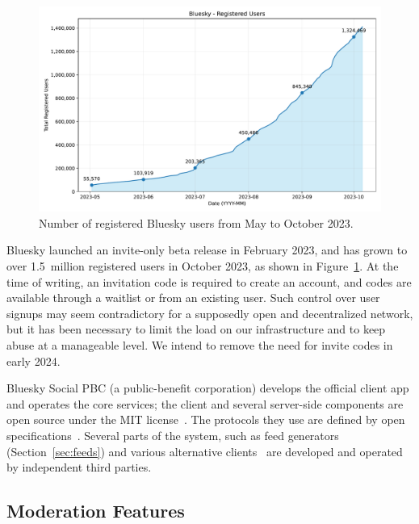 \documentclass[sigconf,nonacm]{acmart}
\begin{document}
\begin{figure}
    \centering
    \includegraphics[width=\linewidth]{user-growth.pdf}
    \caption{Number of registered Bluesky users from May to October 2023.}
    \label{fig:user-growth}
\end{figure}

Bluesky launched an invite-only beta release in February 2023, and has grown to over 1.5~million registered users in October 2023, as shown in Figure~\ref{fig:user-growth}.
At the time of writing, an invitation code is required to create an account, and codes are available through a waitlist or from an existing user.
Such control over user signups may seem contradictory for a supposedly open and decentralized network, but it has been necessary to limit the load on our infrastructure and to keep abuse at a manageable level.
We intend to remove the need for invite codes in early 2024.

Bluesky Social PBC (a public-benefit corporation) develops the official client app and operates the core services; the client and several server-side components are open source under the MIT license~\cite{BlueskyGithub}.
The protocols they use are defined by open specifications~\cite{AtProtoSpecs}.
Several parts of the system, such as feed generators (Section~\ref{sec:feeds}) and various alternative clients~\cite{AtProtoClients} are developed and operated by independent third parties.

\subsection{Moderation Features}\label{sec:moderation}
\end{document}
